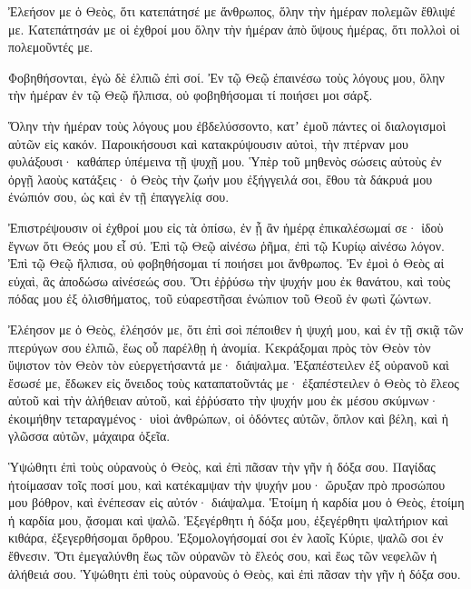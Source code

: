 \begin{spacing}{1.1}
\begin{multicols}{2}
Ἐλεήσον με ὁ Θεὸς, ὅτι κατεπάτησέ με ἄνθρωπος, ὅλην τὴν ἡμέραν πολεμῶν ἔθλιψέ με.
Κατεπάτησάν με οἱ ἐχθροί μου ὅλην τὴν ἡμέραν ἀπὸ ὕψους ἡμέρας, ὅτι πολλοὶ οἱ πολεμοῦντές με.

Φοβηθήσονται, ἐγὼ δὲ ἐλπιῶ ἐπὶ σοί.
Ἐν τῷ Θεῷ ἐπαινέσω τοὺς λόγους μου, ὅλην τὴν ἡμέραν ἐν τῷ Θεῷ ἤλπισα, οὐ φοβηθήσομαι τί ποιήσει μοι σάρξ.

Ὅλην τὴν ἡμέραν τοὺς λόγους μου ἐβδελύσσοντο, κατʼ ἐμοῦ πάντες οἱ διαλογισμοὶ αὐτῶν εἰς κακόν.
Παροικήσουσι καὶ κατακρύψουσιν αὐτοὶ, τὴν πτέρναν μου φυλάξουσι· καθάπερ ὑπέμεινα τῇ ψυχῇ μου.
Ὑπὲρ τοῦ μηθενὸς σώσεις αὐτοὺς ἐν ὀργῇ λαοὺς κατάξεις· ὁ Θεὸς
τὴν ζωήν μου ἐξήγγειλά σοι, ἔθου τὰ δάκρυά μου ἐνώπιόν σου, ὡς καὶ ἐν τῇ ἐπαγγελίᾳ σου.

Ἐπιστρέψουσιν οἱ ἐχθροί μου εἰς τὰ ὀπίσω, ἐν ᾗ ἂν ἡμέρᾳ ἐπικαλέσωμαί σε· ἰδοὺ ἔγνων ὅτι Θεός μου εἶ σύ.
Ἐπὶ τῷ Θεῷ αἰνέσω ῥῆμα, ἐπὶ τῷ Κυρίῳ αἰνέσω λόγον.
Ἐπὶ τῷ Θεῷ ἤλπισα, οὐ φοβηθήσομαι τί ποιήσει μοι ἄνθρωπος.
Ἐν ἐμοὶ ὁ Θεὸς αἱ εὐχαὶ, ἃς ἀποδώσω αἰνέσεώς σου.
Ὅτι ἐῤῥύσω τὴν ψυχήν μου ἐκ θανάτου, καὶ τοὺς πόδας μου ἐξ ὀλισθήματος, τοῦ εὐαρεστῆσαι ἐνώπιον τοῦ Θεοῦ ἐν φωτὶ ζώντων.

Ἐλέησον με ὁ Θεὸς, ἐλέησόν με, ὅτι ἐπὶ σοὶ πέποιθεν ἡ ψυχή μου, καὶ ἐν τῇ σκιᾷ τῶν πτερύγων σου ἐλπιῶ, ἕως οὗ παρέλθῃ ἡ ἀνομία.
Κεκράξομαι πρὸς τὸν Θεὸν τὸν ὕψιστον τὸν Θεὸν τὸν εὐεργετήσαντά με· διάψαλμα.
Ἐξαπέστειλεν ἐξ οὐρανοῦ καὶ ἔσωσέ με, ἔδωκεν εἰς ὄνειδος τοὺς καταπατοῦντάς με· ἐξαπέστειλεν ὁ Θεὸς τὸ ἔλεος αὐτοῦ καὶ τὴν ἀλήθειαν αὐτοῦ,
καὶ ἐῤῥύσατο τὴν ψυχήν μου ἐκ μέσου σκύμνων· ἐκοιμήθην τεταραγμένος· υἱοὶ ἀνθρώπων, οἱ ὀδόντες αὐτῶν, ὅπλον καὶ βέλη, καὶ ἡ γλῶσσα αὐτῶν, μάχαιρα ὀξεῖα.

Ὑψώθητι ἐπὶ τοὺς οὐρανοὺς ὁ Θεὸς, καὶ ἐπὶ πᾶσαν τὴν γῆν ἡ δόξα σου.
Παγίδας ἡτοίμασαν τοῖς ποσί μου, καὶ κατέκαμψαν τὴν ψυχήν μου· ὤρυξαν πρὸ προσώπου μου βόθρον, καὶ ἐνέπεσαν εἰς αὐτόν· διάψαλμα.
Ἑτοίμη ἡ καρδία μου ὁ Θεὸς, ἑτοίμη ἡ καρδία μου, ᾄσομαι καὶ ψαλῶ.
Ἐξεγέρθητι ἡ δόξα μου, ἐξεγέρθητι ψαλτήριον καὶ κιθάρα, ἐξεγερθήσομαι ὄρθρου.
Ἐξομολογήσομαί σοι ἐν λαοῖς Κύριε, ψαλῶ σοι ἐν ἔθνεσιν.
Ὅτι ἐμεγαλύνθη ἕως τῶν οὐρανῶν τὸ ἔλεός σου, καὶ ἕως τῶν νεφελῶν ἡ ἀλήθειά σου.
Ὑψώθητι ἐπὶ τοὺς οὐρανοὺς ὁ Θεὸς, καὶ ἐπὶ πᾶσαν τὴν γῆν ἡ δόξα σου.


\end{multicols}
\end{spacing}

